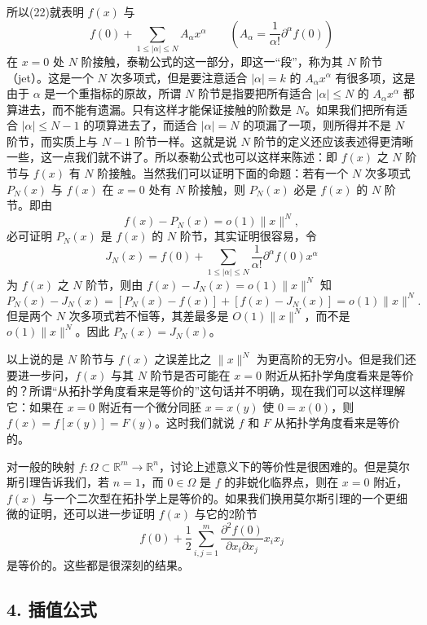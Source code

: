 所以(22)就表明 $f(x)$ 与
\[
 f(0)+\sum_{1\le |\alpha|\le N}A_\alpha x^\alpha
 \qquad\left(A_\alpha=\frac1{\alpha!}\partial^\alpha f(0)\right)
\]
在 $x=0$ 处 $N$ 阶接触，泰勒公式的这一部分，即这一“段”，称为其 $N$ 阶节（jet）。这是一个 $N$ 次多项式，但是要注意适合 $|\alpha|=k$ 的 $A_\alpha x^\alpha$ 有很多项，这是由于 $\alpha$ 是一个重指标的原故，所谓 $N$ 阶节是指要把所有适合 $|\alpha|\le N$ 的 $A_\alpha x^\alpha$ 都算进去，而不能有遗漏。只有这样才能保证接触的阶数是 $N$。如果我们把所有适合 $|\alpha|\le N-1$ 的项算进去了，而适合 $|\alpha|=N$ 的项漏了一项，则所得并不是 $N$ 阶节，而实质上与 $N-1$ 阶节一样。这就是说 $N$ 阶节的定义还应该表述得更清晰一些，这一点我们就不讲了。所以泰勒公式也可以这样来陈述：即 $f(x)$ 之 $N$ 阶节与 $f(x)$ 有 $N$ 阶接触。当然我们可以证明下面的命题：若有一个 $N$ 次多项式 $P_N(x)$ 与 $f(x)$ 在 $x=0$ 处有 $N$ 阶接触，则 $P_N(x)$ 必是 $f(x)$ 的 $N$ 阶节。即由
\[
 f(x)-P_N(x)=o(1)\lVert x\rVert^N,
\]
必可证明 $P_N(x)$ 是 $f(x)$ 的 $N$ 阶节，其实证明很容易，令
\[
 J_N(x)=f(0)+\sum_{1\le|\alpha|\le N}\frac1{\alpha!}\partial^\alpha f(0)x^\alpha
\]
为 $f(x)$ 之 $N$ 阶节，则由 $f(x)-J_N(x)=o(1)\lVert x\rVert^N$ 知
\[
 P_N(x)-J_N(x)=[P_N(x)-f(x)]+[f(x)-J_N(x)]=o(1)\lVert x\rVert^N.
\]
但是两个 $N$ 次多项式若不恒等，其差最多是 $O(1)\lVert x\rVert^N$，而不是 $o(1)\lVert x\rVert^N$。因此 $P_N(x)=J_N(x)$。

以上说的是 $N$ 阶节与 $f(x)$ 之误差比之 $\lVert x\rVert^N$ 为更高阶的无穷小。但是我们还要进一步问，$f(x)$ 与其 $N$ 阶节是否可能在 $x=0$ 附近从拓扑学角度看来是等价的？所谓“从拓扑学角度看来是等价的”这句话并不明确，现在我们可以这样理解它：如果在 $x=0$ 附近有一个微分同胚 $x=x(y)$ 使 $0=x(0)$，则 $f(x)=f[x(y)]=F(y)$。这时我们就说 $f$ 和 $F$ 从拓扑学角度看来是等价的。

对一般的映射 $f:\Omega\subset\mathbb R^m\to\mathbb R^n$，讨论上述意义下的等价性是很困难的。但是莫尔斯引理告诉我们，若 $n=1$，而 $0\in\Omega$ 是 $f$ 的非蜕化临界点，则在 $x=0$ 附近，$f(x)$ 与一个二次型在拓扑学上是等价的。如果我们换用莫尔斯引理的一个更细微的证明，还可以进一步证明 $f(x)$ 与它的2阶节
\[
 f(0)+\frac12\sum_{i,j=1}^m\frac{\partial^2f(0)}{\partial x_i\partial x_j}x_ix_j
\]
是等价的。这些都是很深刻的结果。

\subsection*{4. 插值公式}

